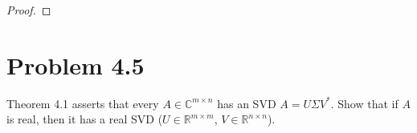 \documentclass{article}
\begin{document}
\begin{proof}

\end{proof}




\pagebreak
\section*{Problem 4.5}
Theorem 4.1 asserts that every $A \in \mathbb{C}^{m \times n}$ has an SVD $A = U\Sigma V^*$. Show that if $A$ is real, then it has a real SVD ($U \in \mathbb{R}^{m \times m}$, $V \in \mathbb{R}^{n \times n}$).\\
\end{document}
